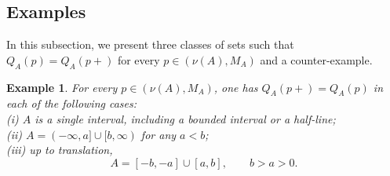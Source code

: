 \documentclass[a4paper, 11pt]{article}
\newcommand{\1}{\mathbf 1}
\theoremstyle{plain}
\newtheorem{example}{Example}[section]
\begin{document}
\subsection{Examples}
In this subsection, we present three classes of sets such that $Q_A(p)=Q_A(p+)$ for every \(p\in(\nu(A),M_A)\) and a counter-example.
\begin{example}
\label{cor:concrete-continuity}
For every \(p\in(\nu(A),M_A)\), one has \(Q_A(p+)=Q_A(p)\) in each of the following cases:\\
  (i) \(A\) is a single interval, including a bounded interval or a half-line;\\
  (ii) \(A=(-\infty,a]\cup[b,\infty)\) for any \(a<b\);\\
  (iii) up to translation,
  \[A=[-b,-a]\cup[a,b],
    \qquad b>a>0.\]
\end{example}
\end{document}
